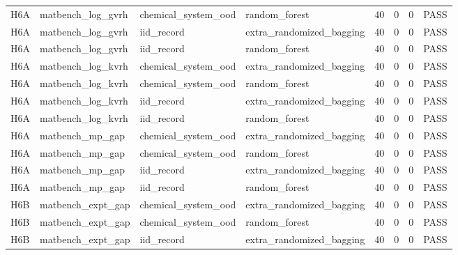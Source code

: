 \documentclass[10pt]{article}
\begin{document}
\begin{landscape}
\begin{longtable}{L{.32in}L{1.05in}L{1.2in}L{1.3in}L{.42in}L{.42in}L{.42in}L{.48in}}
H6A & matbench\_\allowbreak{}log\_\allowbreak{}gvrh & chemical\_\allowbreak{}system\_\allowbreak{}ood & random\_\allowbreak{}forest & 40 & 0 & 0 & PASS\\
H6A & matbench\_\allowbreak{}log\_\allowbreak{}gvrh & iid\_\allowbreak{}record & extra\_\allowbreak{}randomized\_\allowbreak{}bagging & 40 & 0 & 0 & PASS\\
H6A & matbench\_\allowbreak{}log\_\allowbreak{}gvrh & iid\_\allowbreak{}record & random\_\allowbreak{}forest & 40 & 0 & 0 & PASS\\
H6A & matbench\_\allowbreak{}log\_\allowbreak{}kvrh & chemical\_\allowbreak{}system\_\allowbreak{}ood & extra\_\allowbreak{}randomized\_\allowbreak{}bagging & 40 & 0 & 0 & PASS\\
H6A & matbench\_\allowbreak{}log\_\allowbreak{}kvrh & chemical\_\allowbreak{}system\_\allowbreak{}ood & random\_\allowbreak{}forest & 40 & 0 & 0 & PASS\\
H6A & matbench\_\allowbreak{}log\_\allowbreak{}kvrh & iid\_\allowbreak{}record & extra\_\allowbreak{}randomized\_\allowbreak{}bagging & 40 & 0 & 0 & PASS\\
H6A & matbench\_\allowbreak{}log\_\allowbreak{}kvrh & iid\_\allowbreak{}record & random\_\allowbreak{}forest & 40 & 0 & 0 & PASS\\
H6A & matbench\_\allowbreak{}mp\_\allowbreak{}gap & chemical\_\allowbreak{}system\_\allowbreak{}ood & extra\_\allowbreak{}randomized\_\allowbreak{}bagging & 40 & 0 & 0 & PASS\\
H6A & matbench\_\allowbreak{}mp\_\allowbreak{}gap & chemical\_\allowbreak{}system\_\allowbreak{}ood & random\_\allowbreak{}forest & 40 & 0 & 0 & PASS\\
H6A & matbench\_\allowbreak{}mp\_\allowbreak{}gap & iid\_\allowbreak{}record & extra\_\allowbreak{}randomized\_\allowbreak{}bagging & 40 & 0 & 0 & PASS\\
H6A & matbench\_\allowbreak{}mp\_\allowbreak{}gap & iid\_\allowbreak{}record & random\_\allowbreak{}forest & 40 & 0 & 0 & PASS\\
H6B & matbench\_\allowbreak{}expt\_\allowbreak{}gap & chemical\_\allowbreak{}system\_\allowbreak{}ood & extra\_\allowbreak{}randomized\_\allowbreak{}bagging & 40 & 0 & 0 & PASS\\
H6B & matbench\_\allowbreak{}expt\_\allowbreak{}gap & chemical\_\allowbreak{}system\_\allowbreak{}ood & random\_\allowbreak{}forest & 40 & 0 & 0 & PASS\\
H6B & matbench\_\allowbreak{}expt\_\allowbreak{}gap & iid\_\allowbreak{}record & extra\_\allowbreak{}randomized\_\allowbreak{}bagging & 40 & 0 & 0 & PASS\\

\end{longtable}
\end{landscape}
\end{document}
